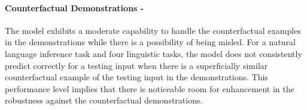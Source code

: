 \paragraph{Counterfactual Demonstrations - \moderate}
The model exhibits a moderate capability to handle the counterfactual examples in the demonstrations while there is a possibility of being misled. For a natural language inference task and four linguistic tasks, the model does not consistently predict correctly for a testing input when there is a superficially similar counterfactual example of the testing input in the demonstrations. This performance level implies that there is noticeable room for enhancement in the robustness against the counterfactual demonstrations.
